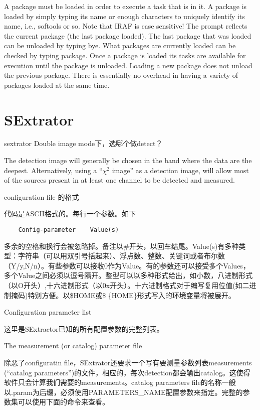 \documentclass[CJK, utf8, GBK, oneside, a4paper, 12pt]{ctexart}
\begin{document}
A package must be loaded in order to execute a task that is in it. A package is loaded by
simply typing its name or enough characters to uniquely identify its name, i.e., softools or
so. Note that IRAF is case sensitive! The prompt reflects the current package (the last package
loaded). The last package that was loaded can be unloaded by typing bye. What packages are
currently loaded can be checked by typing package. Once a package is loaded its tasks are
available for execution until the package is unloaded. Loading a new package does not unload
the previous package. There is essentially no overhead in having a variety of packages loaded
at the same time.

\section{SExtrator}

sextrator Double image mode下，选哪个做detect？

The detection image will generally be chosen in the band where the data are the deepest. Alternatively, using a “$\chi^2$ image” as a detection image, will allow most of the sources present in at least one channel to be detected and measured.

configuration file 的格式

代码是ASCII格式的。每行一个参数。如下
\begin{lstlisting}
    Config-parameter    Value(s)
\end{lstlisting}

多余的空格和换行会被忽略掉。备注以\#开头，以回车结尾。Value(s)有多种类型：字符串（可以用双引号括起来）、浮点数、整数、关键词或者布尔数（Y/y,N/n）。有些参数可以接收0作为Value。有的参数还可以接受多个Values，多个Value之间必须以逗号隔开。整型可以以多种形式给出，如小数，八进制形式（以O开头）,十六进制形式（以0x开头）。十六进制格式对于编写复用位值(如二进制掩码)特别方便。以\$HOME或\$ \{HOME\}形式写入的环境变量将被展开。

Configuration parameter list

这里是SExtractor已知的所有配置参数的完整列表。

The measurement (or catalog) parameter file

除恶了configuratin file，SExtrator还要求一个写有要测量参数列表measurements
(“catalog parameters”)的文件，相应的，每次detection都会输出catalog。这使得软件只会计算我们需要的measurements。catalog parameters file的名称一般以.param为后缀，必须使用PARAMETERS\_NAME配置参数来指定。完整的参数集可以使用下面的命令来查看。
\end{document}
